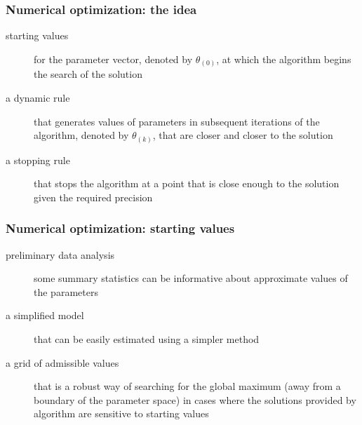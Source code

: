 \documentclass[notes,blackandwhite,mathsans]{beamer}
\begin{document}
\begin{frame}
\frametitle{Numerical optimization: the idea}



\begin{description}
\item[starting values] {\color{mcxs2}for the parameter vector, denoted by} $\theta_{(0)}${\color{mcxs2}, at which the algorithm begins the search of the solution}
\item[a dynamic rule] {\color{mcxs2}that generates values of parameters in subsequent iterations of the algorithm, denoted by} $\theta_{(k)}${\color{mcxs2}, that are closer and closer to the solution}
\item[a stopping rule] {\color{mcxs2}that stops the algorithm at a point that is close enough to the solution given the required precision}
\end{description}

\end{frame}


\begin{frame}
\frametitle{Numerical optimization: starting values}


\begin{description}
\item[preliminary data analysis] {\color{mcxs2}some summary statistics can be informative about approximate values of the parameters}
\item[a simplified model] {\color{mcxs2}that can be easily estimated using a simpler method}
\item[a grid of admissible values] {\color{mcxs2}that is a robust way of searching for the global maximum (away from a boundary of the parameter space) in cases where the solutions provided by algorithm are sensitive to starting values}
\end{description}


\end{frame}
\end{document}
